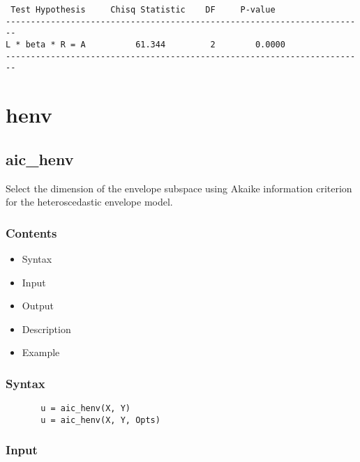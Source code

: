 \documentclass[a4paper,11pt,openany]{memoir}
\begin{document}
        \color{lightgray}\ttfamily \begin{verbatim}
 Test Hypothesis     Chisq Statistic    DF     P-value
------------------------------------------------------------------------
L * beta * R = A          61.344         2        0.0000
------------------------------------------------------------------------
\end{verbatim} \rmfamily
\color{black}
    
\newpage

\chapter{henv}

\rmfamily
\color{black}\section{aic\_henv}

\begin{par}
Select the dimension of the envelope subspace using Akaike information criterion for the heteroscedastic envelope model.
\end{par} \vspace{1em}

\subsection*{Contents}

\begin{itemize}
\setlength{\itemsep}{-1ex}
   \item Syntax
   \item Input
   \item Output
   \item Description
   \item Example
\end{itemize}


\subsection*{Syntax}


\begin{verbatim}       u = aic_henv(X, Y)
       u = aic_henv(X, Y, Opts)\end{verbatim}
    

\subsection*{Input}
\end{document}
